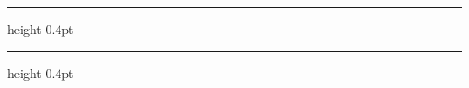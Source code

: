 \clearpage
{\color{navy}\hrule height 0.4pt}
\vspace{0.3cm}
\tableofcontents
\vspace{0.3cm}
{\color{navy}\hrule height 0.4pt}
\clearpage



\bigskip


\bigskip


\bigskip


\bigskip


\bigskip


\bigskip


\bigskip


\bigskip


\bigskip


\bigskip


\bigskip


\bigskip


\bigskip


\bigskip


\bigskip



